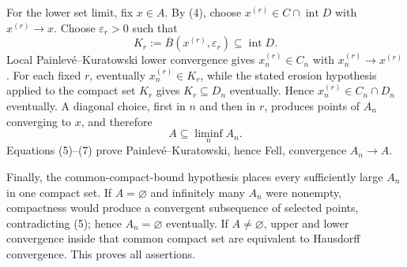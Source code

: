 For the lower set limit, fix \(x\in A\).  By (4), choose \(x^{(r)}\in C\cap\operatorname{int}D\) with \(x^{(r)}\to x\).  Choose \(\varepsilon_r>0\) such that
\[
 K_r:=\overline B(x^{(r)},\varepsilon_r)
 \subseteq\operatorname{int}D.
 \tag{6}
\]
Local Painlev\'e--Kuratowski lower convergence gives \(x_n^{(r)}\in C_n\) with \(x_n^{(r)}\to x^{(r)}\).  For each fixed \(r\), eventually \(x_n^{(r)}\in K_r\), while the stated erosion hypothesis applied to the compact set \(K_r\) gives \(K_r\subseteq D_n\) eventually.  Hence \(x_n^{(r)}\in C_n\cap D_n\) eventually.  A diagonal choice, first in \(n\) and then in \(r\), produces points of \(A_n\) converging to \(x\), and therefore
\[
 A\subseteq\liminf_nA_n.
 \tag{7}
\]
Equations (5)--(7) prove Painlev\'e--Kuratowski, hence Fell, convergence \(A_n\to A\).

Finally, the common-compact-bound hypothesis places every sufficiently large \(A_n\) in one compact set.  If \(A=\varnothing\) and infinitely many \(A_n\) were nonempty, compactness would produce a convergent subsequence of selected points, contradicting (5); hence \(A_n=\varnothing\) eventually.  If \(A\ne\varnothing\), upper and lower convergence inside that common compact set are equivalent to Hausdorff convergence.  This proves all assertions.